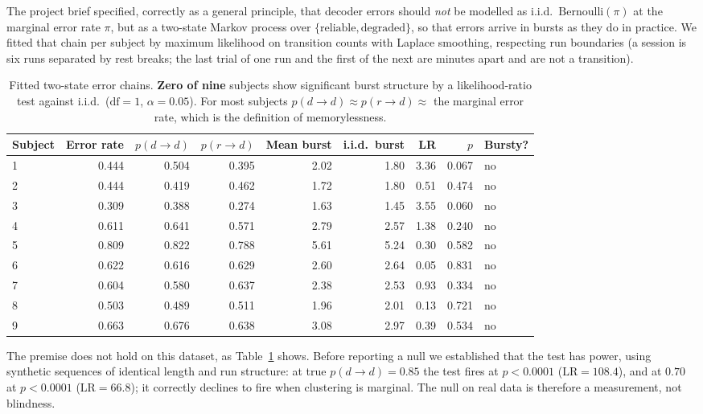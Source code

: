 \documentclass[11pt,a4paper]{article}
\theoremstyle{plain}
\theoremstyle{definition}
\begin{document}
The project brief specified, correctly as a general principle, that
decoder errors should \emph{not} be modelled as i.i.d.\
$\mathrm{Bernoulli}(\pi)$ at the marginal error rate $\pi$, but as a
two-state Markov
process over $\{\text{reliable}, \text{degraded}\}$, so that errors
arrive in bursts as they do in practice. We fitted that chain per
subject by maximum likelihood on transition counts with Laplace
smoothing, respecting run boundaries (a session is six runs separated by
rest breaks; the last trial of one run and the first of the next are
minutes apart and are not a transition).

\begin{table}[htbp]
\centering
\small
\begin{tabular}{@{}lrrrrrrrl@{}}
\toprule
Subject & Error rate & $p(d{\to}d)$ & $p(r{\to}d)$ & Mean burst & i.i.d.\ burst & LR & $p$ & Bursty? \\
\midrule
1 & 0.444 & 0.504 & 0.395 & 2.02 & 1.80 & 3.36 & 0.067 & no \\
2 & 0.444 & 0.419 & 0.462 & 1.72 & 1.80 & 0.51 & 0.474 & no \\
3 & 0.309 & 0.388 & 0.274 & 1.63 & 1.45 & 3.55 & 0.060 & no \\
4 & 0.611 & 0.641 & 0.571 & 2.79 & 2.57 & 1.38 & 0.240 & no \\
5 & 0.809 & 0.822 & 0.788 & 5.61 & 5.24 & 0.30 & 0.582 & no \\
6 & 0.622 & 0.616 & 0.629 & 2.60 & 2.64 & 0.05 & 0.831 & no \\
7 & 0.604 & 0.580 & 0.637 & 2.38 & 2.53 & 0.93 & 0.334 & no \\
8 & 0.503 & 0.489 & 0.511 & 1.96 & 2.01 & 0.13 & 0.721 & no \\
9 & 0.663 & 0.676 & 0.638 & 3.08 & 2.97 & 0.39 & 0.534 & no \\
\bottomrule
\end{tabular}
\caption{Fitted two-state error chains. \textbf{Zero of nine} subjects
show significant burst structure by a likelihood-ratio test against
i.i.d.\ ($\mathrm{df}=1$, $\alpha=0.05$). For most subjects
$p(d{\to}d) \approx p(r{\to}d) \approx$ the marginal error rate, which
is the definition of memorylessness.}
\label{tab:markov}
\end{table}

The premise does not hold on this dataset, as
Table~\ref{tab:markov} shows. Before reporting a null we
established that the test has power, using synthetic sequences of
identical length and run structure: at true $p(d{\to}d) = 0.85$ the test
fires at $p < 0.0001$ ($\mathrm{LR} = 108.4$), and at $0.70$ at
$p<0.0001$ ($\mathrm{LR}=66.8$); it correctly declines to fire when
clustering is marginal. The null on real data is therefore a
measurement, not blindness.
\end{document}
